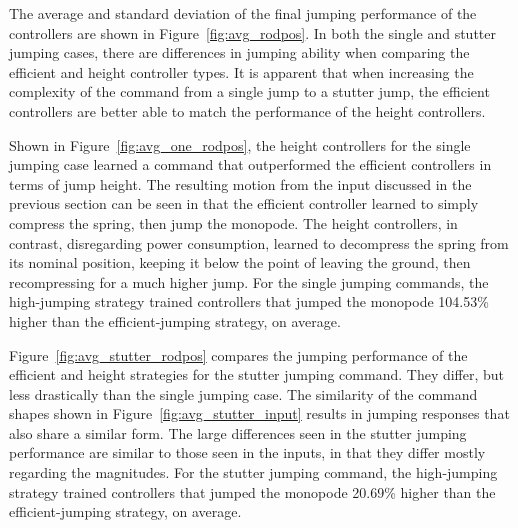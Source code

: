 The average and standard deviation of the final jumping performance of the controllers are shown in Figure~\ref{fig:avg_rodpos}. In both the single and stutter jumping cases, there are differences in jumping ability when comparing the efficient and height controller types. It is apparent that when increasing the complexity of the command from a single jump to a stutter jump, the efficient controllers are better able to match the performance of the height controllers.

Shown in Figure~\ref{fig:avg_one_rodpos}, the height controllers for the single jumping case learned a command that outperformed the efficient controllers in terms of jump height. The resulting motion from the input discussed in the previous section can be seen in that the efficient controller learned to simply compress the spring, then jump the monopode. The height controllers, in contrast, disregarding power consumption, learned to decompress the spring from its nominal position, keeping it below the point of leaving the ground, then recompressing for a much higher jump. For the single jumping commands, the high-jumping strategy trained controllers that jumped the monopode 104.53\% higher than the efficient-jumping strategy, on average.

Figure~\ref{fig:avg_stutter_rodpos} compares the jumping performance of the efficient and height strategies for the stutter jumping command. They differ, but less drastically than the single jumping case. The similarity of the command shapes shown in Figure~\ref{fig:avg_stutter_input} results in jumping responses that also share a similar form. The large differences seen in the stutter jumping performance are similar to those seen in the inputs, in that they differ mostly regarding the magnitudes. For the stutter jumping command, the high-jumping strategy trained controllers that jumped the monopode 20.69\% higher than the efficient-jumping strategy, on average.

